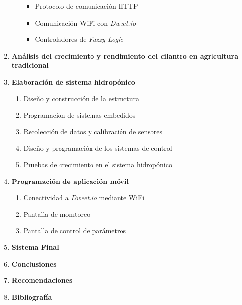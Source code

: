 \begin{enumerate}
\begin{enumerate}
\begin{itemize}
			\item Protocolo de comunicación HTTP
			\item Comunicación WiFi con \textit{Dweet.io}
			\item Controladores de \textit{Fuzzy Logic}
		\end{itemize}
	\end{enumerate}
	\item \textbf{Análisis del crecimiento y rendimiento del cilantro en agricultura tradicional}
	\item \textbf{Elaboración de sistema hidropónico}
	\begin{enumerate}
		\item Diseño y construcción de la estructura
		\item Programación de sistemas embedidos
		\item Recolección de datos y calibración de sensores
		\item Diseño y programación de los sistemas de control
		\item Pruebas de crecimiento en el sistema hidropónico
	\end{enumerate}
	\item \textbf{Programación de aplicación móvil}
	\begin{enumerate}
		\item Conectividad a \textit{Dweet.io} mediante WiFi
		\item Pantalla de monitoreo
		\item Pantalla de control de parámetros
	\end{enumerate}
	\item \textbf{Sistema Final}
	\item \textbf{Conclusiones}
	\item \textbf{Recomendaciones}
	\item \textbf{Bibliografía}
\end{enumerate}

